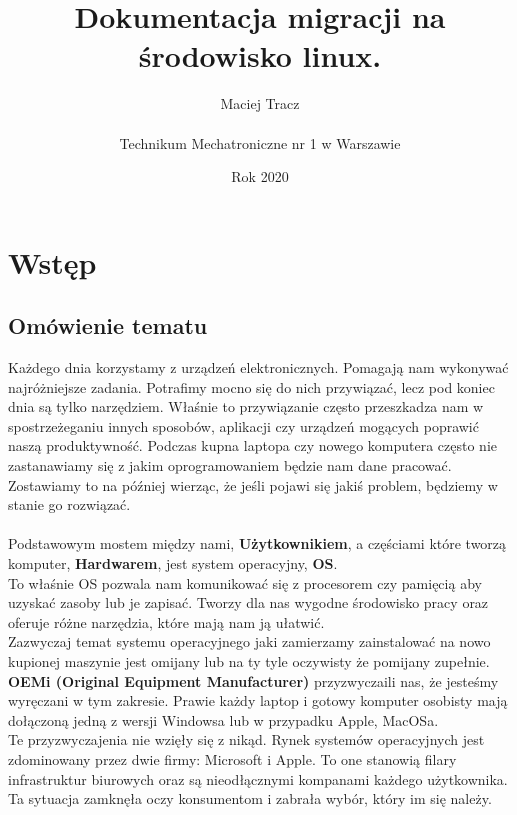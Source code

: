 \documentclass[10pt,a4paper]{report}
\begin{document}
\title{\Huge Dokumentacja migracji na środowisko linux.}
\author{Maciej Tracz \\\\Technikum Mechatroniczne nr 1 w Warszawie}
\date{Rok 2020}
\maketitle

\newpage
\chapter{Wstęp}

	\section{Omówienie tematu}

Każdego dnia korzystamy z urządzeń elektronicznych. Pomagają nam wykonywać najróżniejsze zadania. Potrafimy mocno się do nich przywiązać, lecz pod koniec dnia są tylko narzędziem. Właśnie to przywiązanie często przeszkadza nam w spostrzeżeganiu innych sposobów, aplikacji czy urządzeń mogących poprawić naszą produktywność.
Podczas kupna laptopa czy nowego komputera często nie zastanawiamy się z jakim oprogramowaniem będzie nam dane pracować. Zostawiamy to na później wierząc, że jeśli pojawi się jakiś problem, będziemy w stanie go rozwiązać.\\\\

Podstawowym mostem między nami, \textbf{Użytkownikiem}, a częściami które tworzą komputer, \textbf{Hardwarem}, jest system operacyjny, \textbf{OS}.\\
To właśnie OS pozwala nam komunikować się z procesorem czy pamięcią aby uzyskać zasoby lub je zapisać. Tworzy dla nas wygodne środowisko pracy oraz oferuje różne narzędzia, które mają nam ją ułatwić.\\

Zazwyczaj temat systemu operacyjnego jaki zamierzamy zainstalować na nowo kupionej maszynie jest omijany lub na ty tyle oczywisty że pomijany zupełnie. \textbf{OEMi (Original Equipment Manufacturer)} przyzwyczaili nas, że jesteśmy wyręczani w tym zakresie. Prawie każdy laptop i gotowy komputer osobisty mają dołączoną jedną z wersji Windowsa lub w przypadku Apple, MacOSa.\\
Te przyzwyczajenia nie wzięły się z nikąd. Rynek systemów operacyjnych jest zdominowany przez dwie firmy: Microsoft i Apple. To one stanowią filary infrastruktur biurowych oraz są nieodłącznymi kompanami każdego użytkownika. Ta sytuacja zamknęła oczy konsumentom i zabrała wybór, który im się należy.\\\\
\end{document}
